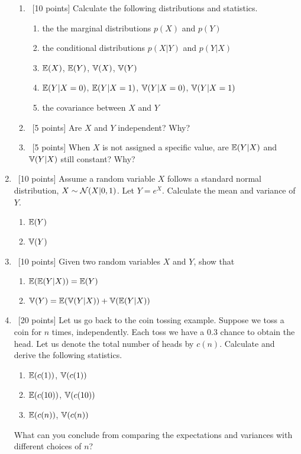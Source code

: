 \documentclass[12pt, fullpage,letterpaper]{article}
\begin{document}
\begin{enumerate}
        \begin{enumerate}
            \item~[10 points] Calculate the following distributions and statistics. 
            \begin{enumerate}
            \item the the marginal distributions $p(X)$ and $p(Y)$
            \item the conditional distributions $p(X|Y)$ and $p(Y|X)$
            \item $\mathbb{E}(X)$, $\mathbb{E}(Y)$, $\mathbb{V}(X)$, $\mathbb{V}(Y)$
            \item  $\mathbb{E}(Y|X=0)$, $\mathbb{E}(Y|X=1)$,  $\mathbb{V}(Y|X=0)$, $\mathbb{V}(Y|X=1)$ 
            \item  the covariance between $X$ and $Y$
            \end{enumerate}
            \item~[5 points] Are $X$ and $Y$ independent? Why?
            \item~[5 points] When $X$ is not assigned a specific value, are $\mathbb{E}(Y|X)$ and $\mathbb{V}(Y|X)$ still constant? Why?
        \end{enumerate}
\item~[10 points] Assume a random variable $X$ follows a standard normal distribution, \ie $X \sim \mathcal{N}(X|0, 1)$. Let $Y = e^X$. Calculate the mean and variance of $Y$.
\begin{enumerate}
	\item $\mathbb{E}(Y)$
	\item $\mathbb{V}(Y)$
\end{enumerate}

\item~[10 points]  Given two random variables $X$ and $Y$, show that 
\begin{enumerate}
\item $\mathbb{E}(\mathbb{E}(Y|X)) = \mathbb{E}(Y)$
\item
$\mathbb{V}(Y) = \mathbb{E}(\mathbb{V}(Y|X)) + \mathbb{V}(\mathbb{E}(Y|X))$
\end{enumerate}

\item~[20 points]  Let us go back to the coin tossing example. Suppose we toss a coin for $n$ times, independently. Each toss we have a $0.3$ chance to obtain the head. Let us denote the total number of heads by $c(n)$. Calculate and derive the following statistics. 
\begin{enumerate}
\item $\mathbb{E}(c(1))$, $\mathbb{V}(c(1))$
\item $\mathbb{E}(c(10))$, $\mathbb{V}(c(10))$
\item $\mathbb{E}(c(n))$, $\mathbb{V}(c(n))$
\end{enumerate} 
What can you conclude from comparing the expectations and variances with different choices of $n$?  


\end{enumerate}
\end{document}
